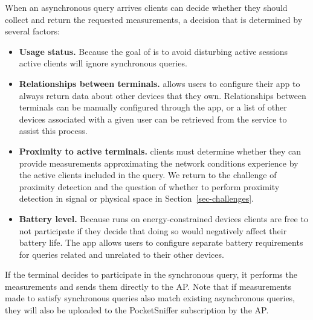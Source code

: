 When an asynchronous query arrives \PS{} clients can decide whether they
should collect and return the requested measurements, a decision that is
determined by several factors:

\begin{itemize}

\item \textbf{Usage status.} Because the goal of \PS{} is to avoid disturbing
active sessions active clients will ignore synchronous queries.

\item \textbf{Relationships between terminals.} \PS{} allows users to
configure their app to always return data about other devices that they own.
Relationships between terminals can be manually configured through the app,
or a list of other devices associated with a given user can be retrieved from
the \PS{} service to assist this process.

\item \textbf{Proximity to active terminals.} \PS{} clients must determine
whether they can provide measurements approximating the network conditions
experience by the active clients included in the query. We return to the
challenge of proximity detection and the question of whether to perform
proximity detection in signal or physical space in
Section~\ref{sec-challenges}.

\item \textbf{Battery level.} Because \PS{} runs on energy-constrained
  devices clients are free to not participate if they decide that doing so
  would negatively affect their battery life. The \PS{} app allows users to
  configure separate battery requirements for queries related and unrelated
  to their other devices.

\end{itemize}

If the terminal decides to participate in the synchronous query, it performs
the measurements and sends them directly to the AP. Note that if measurements
made to satisfy synchronous queries also match existing asynchronous queries,
they will also be uploaded to the PocketSniffer subscription by the AP.
